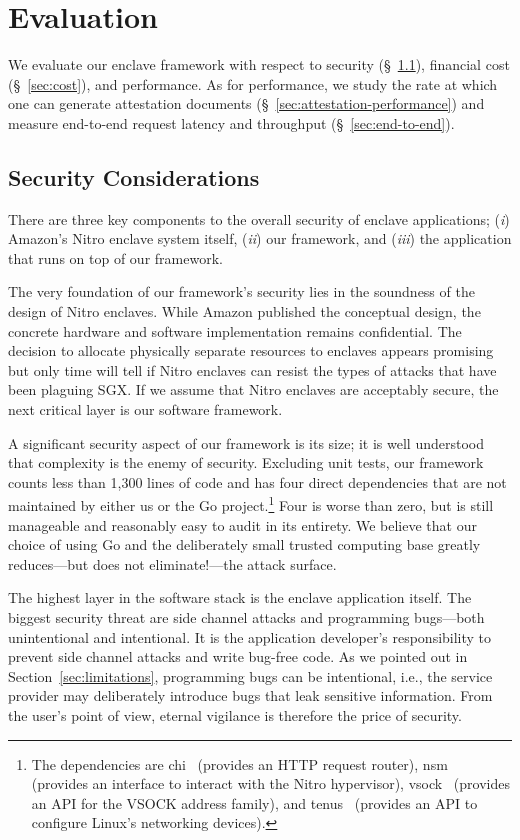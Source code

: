 \section{Evaluation}
\label{sec:evaluation}

We evaluate our enclave framework with respect to
security (\S~\ref{sec:security}),
financial cost (\S~\ref{sec:cost}), and performance.  As for performance, we
study the rate at which one can generate
attestation documents (\S~\ref{sec:attestation-performance}) and
measure end-to-end request latency and throughput (\S~\ref{sec:end-to-end}).

\subsection{Security Considerations}
\label{sec:security}

There are three key components to the overall security of enclave applications;
(\emph{i}) Amazon's Nitro enclave system itself, (\emph{ii}) our framework, and
(\emph{iii}) the application that runs on top of our framework.

The very foundation of our framework's security lies in the soundness of the
design of Nitro enclaves.  While Amazon published the conceptual design, the
concrete hardware and software implementation remains confidential.  The
decision to allocate physically separate resources to enclaves appears promising
but only time will tell if Nitro enclaves can resist the types of attacks that
have been plaguing SGX.  If we assume that Nitro enclaves are acceptably
secure, the next critical layer is our software framework.

A significant security aspect of our framework is its size; it is well
understood that complexity is the enemy of security.  Excluding unit tests, our
framework counts less than 1,300 lines of code and has four direct dependencies
that are not maintained by either us or the Go project.\footnote{The
dependencies are chi~\cite{chi} (provides an HTTP request router),
nsm~\cite{nsm} (provides an interface to interact with the Nitro hypervisor),
vsock~\cite{vsock} (provides an API for the VSOCK address family), and
tenus~\cite{tenus} (provides an API to configure Linux's networking devices).}
Four is worse than zero, but is still manageable and reasonably easy to audit in
its entirety.  We believe that our choice of using Go and the deliberately small
trusted computing base greatly reduces---but does not eliminate!---the attack
surface.

The highest layer in the software stack is the enclave application itself.  The
biggest security threat are side channel attacks and programming bugs---both
unintentional and intentional.  It is the application developer's
responsibility to prevent side channel attacks and write bug-free code.  As we
pointed out in Section~\ref{sec:limitations}, programming bugs can be
intentional, i.e., the service provider may deliberately introduce bugs that
leak sensitive information.  From the user's point of view, eternal vigilance
is therefore the price of security.

